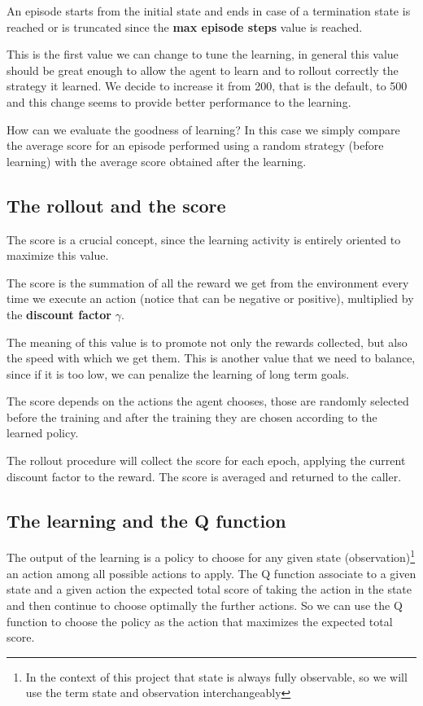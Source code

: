 \documentclass{article}
\begin{document}
An episode starts from the initial state and ends in case of a termination state is reached or 
is truncated since the \textbf{max episode steps} value is reached.

This is the first value we can change to tune the learning, in general this value should be 
great enough to allow the agent to learn and to rollout correctly the strategy it learned.
We decide to increase it from 200, that is the default, to 500 and this change seems to 
provide better performance to the learning.

How can we evaluate the goodness of learning? In this case we simply compare the average score for an episode 
performed using a random strategy (before learning) with the average score obtained after the learning.

\subsection{The rollout and the score}

The score is a crucial concept, since the learning activity is entirely oriented to maximize this value.

The score is the summation of all the reward we get from the environment every time we execute an action 
(notice that can be negative or positive),
multiplied by the \textbf{discount factor} $\gamma$.

The meaning of this value is to promote not only the rewards collected, but also the speed with which we get them.
This is another value that we need to balance, since if it is too low, we can penalize the learning of long term goals.

The score depends on the actions the agent chooses, those are randomly selected before the training 
and after the training they are chosen according to the learned policy.

The rollout procedure will collect the score for each epoch, applying the current discount factor to the reward.
The score is averaged and returned to the caller.

\subsection{The learning and the Q function}

The output of the learning is a policy to choose for any given state (observation)\footnote[2]{
In the context of this project that state is always fully observable, so we will use the term state 
and observation interchangeably} an action among all possible actions to apply.
The Q function associate to a given state and a given action the expected total score of taking the action in the state 
and then continue to choose optimally the further actions.
So we can use the Q function to choose the policy as the action that maximizes the expected total score.
\end{document}
